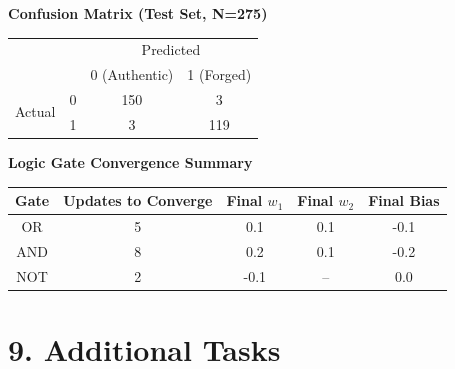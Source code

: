 \documentclass[11pt,a4paper]{article}
\begin{document}
\vspace{3mm}

\textbf{Confusion Matrix (Test Set, N=275)}

\begin{tabular}{ll|cc}
& & \multicolumn{2}{c}{Predicted} \\
& & 0 (Authentic) & 1 (Forged) \\
\hline
\multirow{2}{*}{Actual} & 0 & 150 & 3 \\
& 1 & 3 & 119 \\
\end{tabular}

\vspace{3mm}

\textbf{Logic Gate Convergence Summary}

\begin{tabular}{|c|c|c|c|c|}
\hline
Gate & Updates to Converge & Final $w_1$ & Final $w_2$ & Final Bias\\
\hline
OR  & 5 & 0.1 & 0.1 & -0.1\\
AND & 8 & 0.2 & 0.1 & -0.2\\
NOT & 2 & -0.1 & -- & 0.0\\
\hline
\end{tabular}


\section*{9. Additional Tasks}
\end{document}
